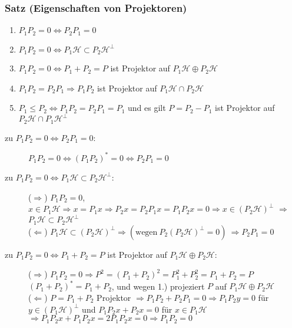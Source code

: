 \documentclass[twoside,a4paper]{scrartcl}
\renewcommand{\1}{\mathds{1}}
\newcommand{\Ra}{\Rightarrow}
\newcommand{\La}{\Leftarrow}
\newcommand{\lra}{\Leftrightarrow}
\renewcommand{\H}{\mathcal{H}}
\begin{document}
\subsubsection*{Satz (Eigenschaften von Projektoren)}
\begin{enumerate}
 \item $P_1P_2=0 \Leftrightarrow P_2P_1=0$
 \item $P_1P_2=0 \Leftrightarrow P_1 \mathcal H \subset P_2 \mathcal H^\bot$
 \item $P_1P_2=0 \Leftrightarrow P_1+P_2=P$ ist Projektor auf $P_1\mathcal H \oplus  P_2 \mathcal H$
 \item $P_1P_2=P_2P_1 \Rightarrow P_1P_2$ ist Projektor auf $P_1\mathcal H \cap  P_2 \mathcal H$
 \item $P_1\leq P_2 \Leftrightarrow P_1P_2=P_2P_1=P_1$ und es gilt $P=P_2-P_1$ ist Projektor auf $P_2 \mathcal H \cap P_1 \mathcal H^\bot$
\end{enumerate}
\begin{description}
\item[zu $P_1P_2=0  \Leftrightarrow P_2P_1=0$:] 
$P_1P_2=0 \lra (P_1P_2)^*=0 \Leftrightarrow P_2P_1=0$
\item[zu $P_1P_2=0 \lra P_1 \mathcal H \subset P_2 \mathcal H^\bot$:]
($\Ra$) $P_1P_2=0$, $x \in P_1 \H \Ra x=P_1x \Ra P_2x=P_2P_1x=P_1P_2x=0 \Ra x \in (P_2\H)^\bot$ $\Ra$ $P_1 \H \subset P_2 \H^\bot$\\
($\La$) $P_1\H \subset (P_2 \H)^\bot \Ra (\mathrm{wegen} \ P_2(P_2\H)^\bot=0)\ \Ra P_2P_1=0$
\item[zu $P_1P_2=0 \Leftrightarrow P_1+P_2=P$ ist Projektor auf $P_1\mathcal H \oplus  P_2 \mathcal H$:]
($\Ra$) $P_1P_2=0 \Ra P^2=(P_1+P_2)^2=P_1^2+P_2^2=P_1+P_2=P$\\
$(P_1+P_2)^*=P_1+P_2$, und wegen 1.) projeziert $P$ auf $P_1\H \oplus P_2\H$\\
($\La$) $P=P_1+P_2$ Projektor $\Ra P_1P_2+P_2P_1=0 \Ra P_1P_2y=0$ für $y \in (P_1\H)^\bot$ und $P_1P_2x+P_2x=0$ für $x \in P_1\H$\\
$\Ra P_1P_2x+P_1P_2x=2P_1P_2x=0 \Ra P_1P_2=0$  
\end{description}
\end{document}
